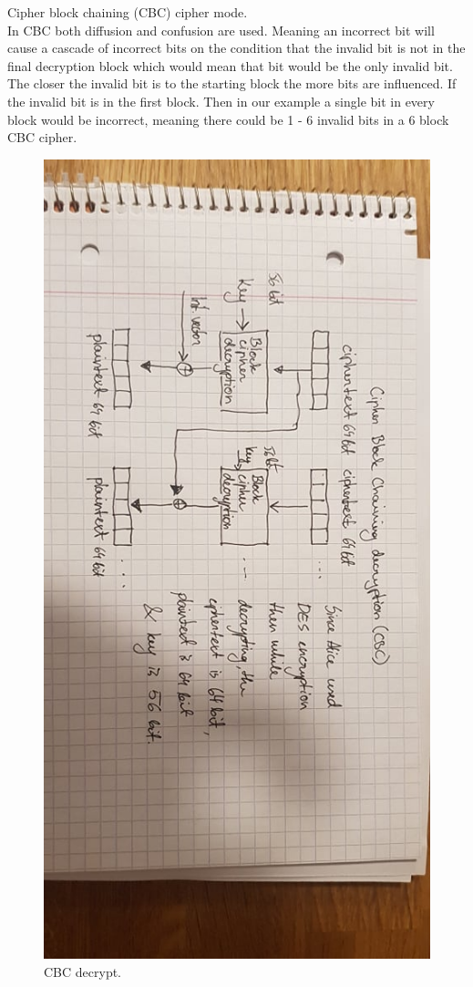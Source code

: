 \documentclass{article}
\begin{document}
Cipher block chaining (CBC) cipher mode.\\
In CBC both diffusion and confusion are used. Meaning an incorrect bit will cause a cascade of incorrect bits
on the condition that the invalid bit is not in the final decryption block which would mean that bit would be the only invalid bit.
The closer the invalid bit is to the starting block the more bits are influenced.
If the invalid bit is in the first block. Then in our example a single bit in every block would be incorrect, meaning
there could be 1 - 6 invalid bits in a 6 block CBC cipher.
\begin{figure}[H]
    \centering
    \label{fig:dh}
    \includegraphics[scale=0.5, angle=90]{cbc_decrypt.jpg}
    \caption{CBC decrypt.}
\end{figure}
\end{document}
